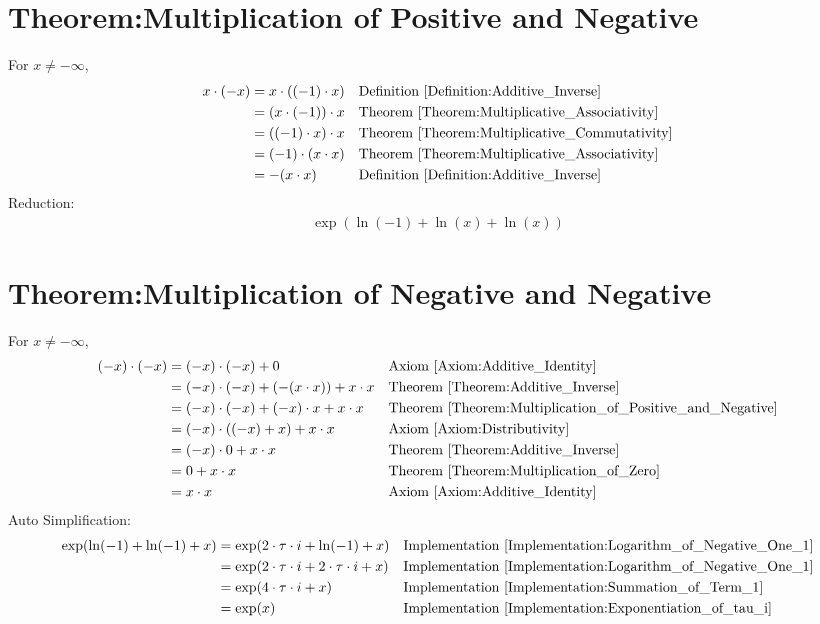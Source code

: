 \documentclass[12pt,a4paper]{report}
\begin{document}
\section{Theorem:Multiplication of Positive and Negative}
\label{Theorem:Multiplication_of_Positive_and_Negative}
For $x \neq -\infty$,
\begin{align*}
x \cdot (-x)
&= x \cdot ((-1) \cdot x)
&& \text{Definition \ref{Definition:Additive_Inverse}} \\
&= (x \cdot (-1)) \cdot x
&& \text{Theorem \ref{Theorem:Multiplicative_Associativity}} \\
&= ((-1) \cdot x) \cdot x
&& \text{Theorem \ref{Theorem:Multiplicative_Commutativity}} \\
&= (-1) \cdot (x \cdot x)
&& \text{Theorem \ref{Theorem:Multiplicative_Associativity}} \\
&= - (x \cdot x)
&& \text{Definition \ref{Definition:Additive_Inverse}} \\
\end{align*}
Reduction:
\begin{align*}
\exp(\ln(-1) + \ln(x) + \ln(x))
\end{align*}

\section{Theorem:Multiplication of Negative and Negative}
\label{Theorem:Multiplication_of_Negative_and_Negative}
For $x \neq -\infty$,
\begin{align*}
(-x) \cdot (-x)
&= (-x) \cdot (-x) + 0
&& \text{Axiom \ref{Axiom:Additive_Identity}} \\
&= (-x) \cdot (-x) + (-(x \cdot x)) + x \cdot x
&& \text{Theorem \ref{Theorem:Additive_Inverse}} \\
&= (-x) \cdot (-x) + (-x) \cdot x + x \cdot x
&& \text{Theorem \ref{Theorem:Multiplication_of_Positive_and_Negative}} \\
&= (-x) \cdot ((-x) +  x) + x \cdot x
&& \text{Axiom \ref{Axiom:Distributivity}} \\
&= (-x) \cdot 0 + x \cdot x
&& \text{Theorem \ref{Theorem:Additive_Inverse}} \\
&= 0 + x \cdot x
&& \text{Theorem \ref{Theorem:Multiplication_of_Zero}} \\
&= x \cdot x
&& \text{Axiom \ref{Axiom:Additive_Identity}} \\
\end{align*}
Auto Simplification:
\begin{align*}
\exp(\ln(-1) + \ln(-1) + x)
&= \exp(2 \cdot \tau \cdot i + \ln(-1) + x)
&& \text{Implementation \ref{Implementation:Logarithm_of_Negative_One_1}} \\
&= \exp(2 \cdot \tau \cdot i + 2 \cdot \tau \cdot i + x)
&& \text{Implementation \ref{Implementation:Logarithm_of_Negative_One_1}} \\
&= \exp(4 \cdot \tau \cdot i + x)
&& \text{Implementation \ref{Implementation:Summation_of_Term_1}} \\
&= \exp(x)
&& \text{Implementation \ref{Implementation:Exponentiation_of_tau_i}} \\
\end{align*}
\end{document}
